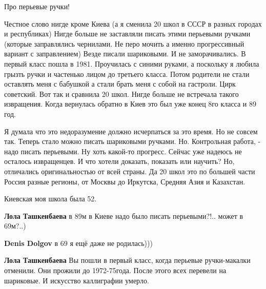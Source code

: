 \begin{itemize}


Про перьевые ручки! 

Честное слово нигде кроме Киева (а я сменила 20 школ в СССР в разных городах и
республиках) Нигде больше не заставляли писать этими перьевыми ручками (которые
заправлялись чернилами. Не перо мочить а именно прогрессивный вариант с
заправлением) Везде писали шариковыми. И не заморачивались. В первый класс
пошла в 1981. Проучилась с синими руками, а поскольку я любила грызть ручки и
частенько лицом до третьего класса. Потом родители не стали оставлять меня с
бабушкой а стали брать меня с собой на гастроли. Цирк советский. Вот так и
сравнила 20 школ. Нигде больше не встречала такого извращения. Когда вернулась
обратно в Киев это был уже конец 8го класса и 89 год. 

Я думала что это недоразумение должно исчерпаться за это время. Но не совсем
так. Теперь стало можно писать шариковыми ручками. Но. Контрольная работа, -
надо писать перьевыми. Ну хоть какой-то прогресс. Сейчас уже надеюсь не
осталось извращенцев. И что хотели доказать, показать или научить? Но,
отличались оригинальностью от всей страны. Да 20 школ это по большей части
Россия разные регионы, от Москвы до Иркутска, Средняя Азия и Казахстан.

Киевская моя школа была 52.

\begin{itemize}
 
\textbf{Лола Ташкенбаева} в 89м в Киеве надо было писать перьевыми?!..
может в 69м?..)

\begin{itemize}
 
\textbf{Denis Dolgov} в 69 я ещё даже не родилась)))
\end{itemize}

 
\textbf{Лола Ташкенбаева} Вы пошли в первый класс, когда перьевые ручки-макалки
отменили. Они прожили до 1972-75года. После этого всех перевели на шариковые. И
искусство каллиграфии умерло.

\end{itemize}

\end{itemize}


